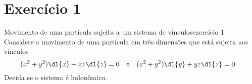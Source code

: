 \section*{Exercício 1}
\begin{exercício}{Movimento de uma partícula sujeita a um sistema de vínculos}{exercício 1}
    Considere o movimento de uma partícula em três dimensões que está sujeita aos vínculos
    \[(x^2 + y^2)\dl{x} + xz\dl{z} = 0\quad\text{e}\quad(x^2+y^2)\dl{y} + yz\dl{z} = 0.\]
    Decida se o sistema é holonômico.
\end{exercício}
%
